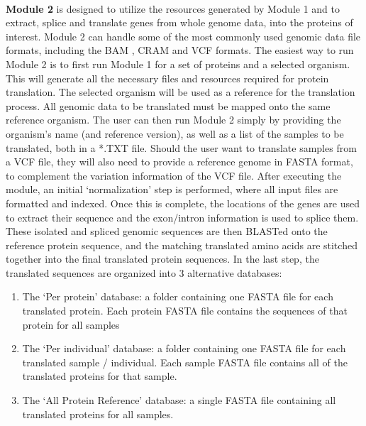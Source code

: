 \documentclass[twocolumn,showpacs,%
  nofootinbib,aps,superscriptaddress,%
  eqsecnum,prd,notitlepage,showkeys,10pt]{report}
\begin{document}
\paragraph{}

\textbf{Module 2} is designed to utilize the resources generated by Module 1 and to extract, splice and translate genes from whole genome data, into the proteins of interest. Module 2 can handle some of the most commonly used genomic data file formats, including the BAM \cite{li2009sequence}, CRAM \cite{bonfield2022cram} and VCF \cite{danecek2011variant} formats. The easiest way to run Module 2 is to first run Module 1 for a set of proteins and a selected organism. This will generate all the necessary files and resources required for protein translation. The selected organism will be used as a reference for the translation process. All genomic data to be translated must be mapped onto the same reference organism. The user can then run Module 2 simply by providing the organism’s name (and reference version), as well as a list of the samples to be translated, both in a *.TXT file. Should the user want to translate samples from a VCF file, they will also need to provide a reference genome in FASTA format, to complement the variation information of the VCF file. After executing the module, an initial ‘normalization’ step is performed, where all input files are formatted and indexed. Once this is complete, the locations of the genes are used to extract their sequence and the exon/intron information is used to splice them. These isolated and spliced genomic sequences are then BLASTed \cite{camacho2009blast+} onto the reference protein sequence, and the matching translated amino acids are stitched together into the final translated protein sequences. In the last step, the translated sequences are organized into 3 alternative databases:

\begin{enumerate}
\item The ‘Per protein’ database: a folder containing one FASTA file for each translated protein. Each protein FASTA file contains the sequences of that protein for all samples
\item The ‘Per individual’ database: a folder containing one FASTA file for each translated sample / individual. Each sample FASTA file contains all of the translated proteins for that sample.
\item The ‘All Protein Reference’ database: a single FASTA file containing all translated proteins for all samples.
\end{enumerate}
\end{document}

